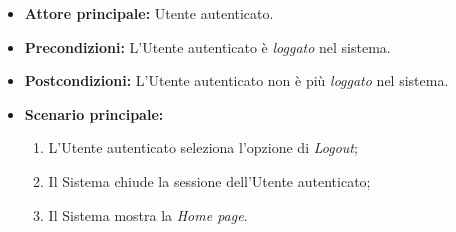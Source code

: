 \label{usecase:Effettua logout}
\begin{itemize}
	\item \textbf{Attore principale:} Utente autenticato.
	\item \textbf{Precondizioni:} L'Utente autenticato è \textit{loggato} nel
	      sistema.
	\item \textbf{Postcondizioni:} L'Utente autenticato non è più \textit{loggato}
	      nel sistema.
	\item \textbf{Scenario principale:}
	      \begin{enumerate}
		      \item L'Utente autenticato seleziona l'opzione di \textit{Logout};
		      \item Il Sistema chiude la sessione dell'Utente autenticato;
		      \item Il Sistema mostra la \textit{Home page}.
	      \end{enumerate}
\end{itemize}

